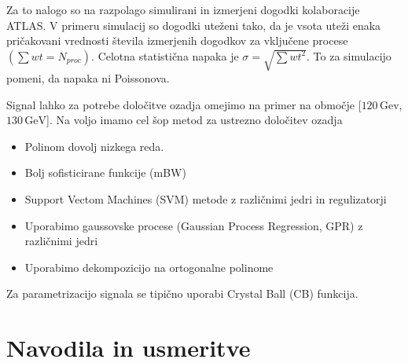 \documentclass[slovene,11pt,a4paper]{article}
\begin{document}
Za to nalogo so na razpolago simulirani in izmerjeni dogodki kolaboracije ATLAS. V primeru simulacij so dogodki uteženi tako, da je vsota uteži enaka pričakovani vrednosti števila izmerjenih dogodkov za vključene procese $(\sum wt = N_{proc})$. Celotna statistična napaka je $\sigma = \sqrt{\sum wt^2}$. To za simulacijo pomeni, da napaka ni Poissonova.

Signal lahko za potrebe določitve ozadja omejimo na primer na območje [$120 \, \text{Gev}$, $130 \, \text{GeV}$]. Na voljo imamo cel šop metod za ustrezno določitev ozadja

\begin{itemize}
    \item Polinom dovolj nizkega reda.
    \item Bolj sofisticirane funkcije (mBW)
    \item Support Vectom Machines (SVM) metode z različnimi jedri in regulizatorji
    \item Uporabimo gaussovske procese (Gaussian Process Regression, GPR) z različnimi jedri
    \item  Uporabimo dekompozicijo na ortogonalne polinome
\end{itemize}

Za parametrizacijo signala se tipično uporabi Crystal Ball (CB) funkcija.

\section{Navodila in usmeritve}
\end{document}
